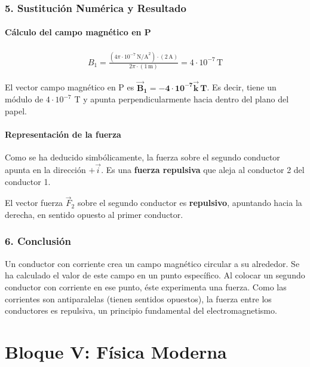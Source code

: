 \subsubsection*{5. Sustitución Numérica y Resultado}
\paragraph{Cálculo del campo magnético en P}
\begin{gather}
    B_1 = \frac{(4\pi\cdot10^{-7}\,\text{N/A}^2) \cdot (2\,\text{A})}{2\pi \cdot (1\,\text{m})} = 4 \cdot 10^{-7} \, \text{T}
\end{gather}
\begin{cajaresultado}
El vector campo magnético en P es $\boldsymbol{\vec{B}_1 = -4 \cdot 10^{-7} \vec{k} \, \textbf{T}}$. Es decir, tiene un módulo de $4 \cdot 10^{-7}$ T y apunta perpendicularmente hacia dentro del plano del papel.
\end{cajaresultado}
\paragraph{Representación de la fuerza}
Como se ha deducido simbólicamente, la fuerza sobre el segundo conductor apunta en la dirección $+\vec{i}$. Es una \textbf{fuerza repulsiva} que aleja al conductor 2 del conductor 1.
\begin{cajaresultado}
El vector fuerza $\vec{F}_2$ sobre el segundo conductor es \textbf{repulsivo}, apuntando hacia la derecha, en sentido opuesto al primer conductor.
\end{cajaresultado}

\subsubsection*{6. Conclusión}
\begin{cajaconclusion}
Un conductor con corriente crea un campo magnético circular a su alrededor. Se ha calculado el valor de este campo en un punto específico. Al colocar un segundo conductor con corriente en ese punto, éste experimenta una fuerza. Como las corrientes son antiparalelas (tienen sentidos opuestos), la fuerza entre los conductores es repulsiva, un principio fundamental del electromagnetismo.
\end{cajaconclusion}

\newpage

\section{Bloque V: Física Moderna}
\label{sec:moderna_2018_jun_ord}

